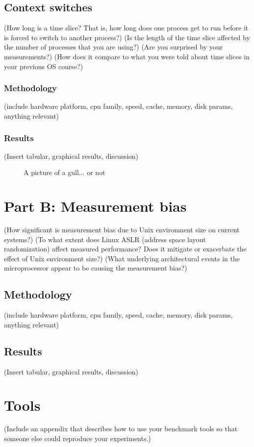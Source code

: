 \documentclass{article}
\begin{document}
\subsection{Context switches}
(How long is a time slice? That is, how long does one process get to run before it is forced to switch to another process?)
(Is the length of the time slice affected by the number of processes that you are using?)
(Are you surprised by your measurements?)
(How does it compare to what you were told about time slices in your previous OS course?)
\subsubsection{Methodology}
(include hardware platform, cpu family, speed, cache, memory, disk params, anything relevant)
\subsubsection{Results}
(Insert tabular, graphical results, discussion)
\begin{figure}[h]
    \caption{A picture of a gull... or not}
    
\end{figure}

\newpage
\section{Part B: Measurement bias}
(How significant is measurement bias due to Unix environment size on current systems?)
(To what extent does Linux ASLR (address space layout randomization) affect measured performance? Does it mitigate or exacerbate the effect of Unix environment size?)
(What underlying architectural events in the microprocessor appear to be causing the measurement bias?)
\subsection{Methodology}
(include hardware platform, cpu family, speed, cache, memory, disk params, anything relevant)
\subsection{Results}
(Insert tabular, graphical results, discussion)

\newpage
\appendix
\section{Tools}
(Include an appendix that describes how to use your benchmark tools so that someone else could reproduce your experiments.)
\end{document}
